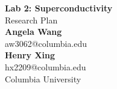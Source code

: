 \documentclass{article}
\begin{document}
	\begin{center}
    
    
		\LARGE{\textbf{Lab 2: Superconductivity}} \\
        \vspace{1em}
        \Large{Research Plan} \\
        \vspace{1em}
        \normalsize\textbf{Angela Wang} \\
        \normalsize{aw3062@columbia.edu} \\
        \vspace{1em}
        \normalsize\textbf{Henry Xing} \\
        \normalsize{hx2209@columbia.edu}\\
        \vspace{1em}
        \normalsize{Columbia University} 
	\end{center}
\end{document}

